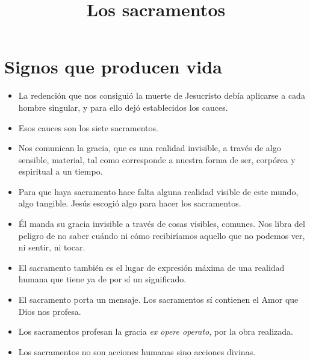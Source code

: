 \documentclass{article}
\title{Los sacramentos}
\begin{document}
    \maketitle
    \section*{Signos que producen vida}
        \begin{itemize}
            \item La redención que nos consiguió la muerte de Jesucristo debía aplicarse a cada hombre singular, y para ello dejó establecidos los cauces. 
            \item Esos cauces son los siete sacramentos.
            \item Nos comunican la gracia, que es una realidad invisible, a través de algo sensible, material, tal como corresponde a nuestra forma de ser, corpórea y espiritual a un tiempo.
            \item Para que haya sacramento hace falta alguna realidad visible de este mundo, algo tangible. Jesús escogió algo para hacer los sacramentos.
            \item Él manda su gracia invisible a través de cosas visibles, comunes. Nos libra del peligro de no saber cuándo ni cómo recibiríamos aquello que no podemos ver, ni sentir, ni tocar.
            \item El sacramento también es el lugar de expresión máxima de una realidad humana que tiene ya de por sí un significado.
            \item El sacramento porta un mensaje. Los sacramentos sí contienen el Amor que Dios nos profesa. 
            \item Los sacramentos profesan la gracia \textit{ex opere operato}, por la obra realizada. 
            \item Los sacramentos no son acciones humanas sino acciones divinas. 
        \end{itemize}
\end{document}
